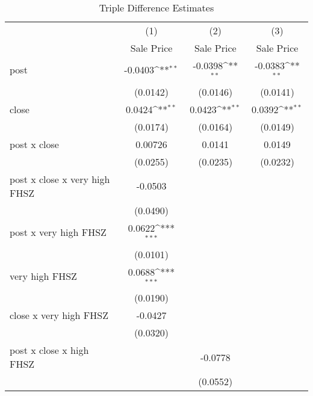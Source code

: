 \begin{table}[htbp]\centering
\def\sym#1{\ifmmode^{#1}\else\(^{#1}\)\fi}
\caption{Triple Difference Estimates\label{tabl}}
\begin{tabular}{l*{3}{c}}
\hline\hline
                    &\multicolumn{1}{c}{(1)}&\multicolumn{1}{c}{(2)}&\multicolumn{1}{c}{(3)}\\
                    &\multicolumn{1}{c}{Sale Price}&\multicolumn{1}{c}{Sale Price}&\multicolumn{1}{c}{Sale Price}\\
\hline
post                &     -0.0403\sym{**} &     -0.0398\sym{**} &     -0.0383\sym{**} \\
                    &    (0.0142)         &    (0.0146)         &    (0.0141)         \\
[1em]
close               &      0.0424\sym{**} &      0.0423\sym{**} &      0.0392\sym{**} \\
                    &    (0.0174)         &    (0.0164)         &    (0.0149)         \\
[1em]
post x close        &     0.00726         &      0.0141         &      0.0149         \\
                    &    (0.0255)         &    (0.0235)         &    (0.0232)         \\
[1em]
post x close x very high FHSZ&     -0.0503         &                     &                     \\
                    &    (0.0490)         &                     &                     \\
[1em]
post x very high FHSZ&      0.0622\sym{***}&                     &                     \\
                    &    (0.0101)         &                     &                     \\
[1em]
very high FHSZ      &      0.0688\sym{***}&                     &                     \\
                    &    (0.0190)         &                     &                     \\
[1em]
close x very high FHSZ&     -0.0427         &                     &                     \\
                    &    (0.0320)         &                     &                     \\
[1em]
post x close x high FHSZ&                     &     -0.0778         &                     \\
                    &                     &    (0.0552)         &                     \\

\end{tabular}
\end{table}
